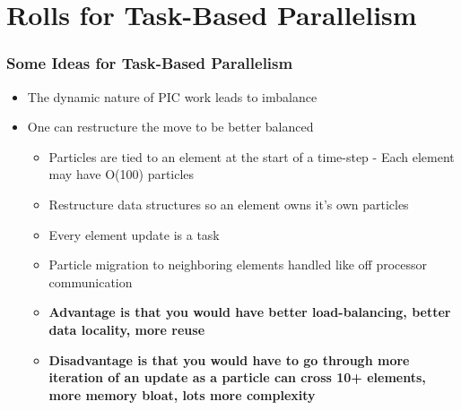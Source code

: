 \documentclass[t]{beamer}
\begin{document}
\section{Rolls for Task-Based Parallelism}
\begin{frame}
 \frametitle{Some Ideas for Task-Based Parallelism}

 \begin{itemize}
   \item The dynamic nature of PIC work leads to imbalance
   \item One can restructure the move to be better balanced
 \begin{itemize}
   \item Particles are tied to an element at the start of a time-step -
     Each element may have O(100) particles
   \item Restructure data structures so an element owns it's own
     particles
   \item Every element update is a task
   \item Particle migration to neighboring elements handled like off
     processor communication
   \item \bf{Advantage is that you would have better load-balancing,
       better data locality, more reuse}
   \item \bf{Disadvantage is that you would have to go through more
       iteration of an update as a particle can cross 10+ elements,
       more memory bloat, lots more complexity}

 \end{itemize}
 \end{itemize}


\end{frame}
\end{document}

